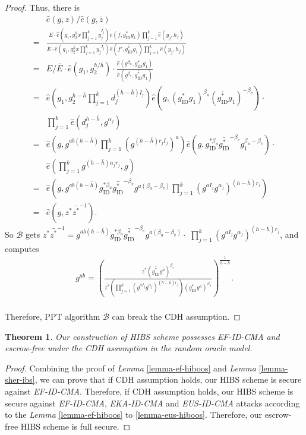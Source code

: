 \documentclass[times]{secauth}
\newtheorem{theorem}{Theorem}[section]
\theoremstyle{definition}
\theoremstyle{remark}
\begin{document}
\begin{proof}
Thus, there is 
\begin{align*}
&\hat{e}(g, z)/\hat{e}(g,\bar{z}) \\
=&\frac{E\cdot \hat{e}(g_1, g_2^hx\prod_{j=1}^k y_j^{I_j})\hat{e}(f, g^*_{\mathrm{ID}}g_1)\prod_{j=1}^k \hat{e}(y_j, h_j)}{\bar{E}\cdot \hat{e}(g_1, g_2^{\bar{h}}x\prod_{j=1}^k {y_j}^{I_j})\hat{e}(f', \bar{g^*_{\mathrm{ID}}}g_1)\prod_{j=1}^k \hat{e}(y_j, h_j)}\\
=& E/\bar{E}\cdot \hat{e}(g_1, g_2^{h/\bar{h}})\cdot \frac{\hat{e}(g^{\beta_u}, g^*_{\mathrm{ID}}g_1)}{\hat{e}(g^{\beta_v}, \bar{g^*_{\mathrm{ID}}}g_1)}\\
=& \hat{e}(g_1, g_2^{h-\bar{h}}\prod_{j=1}^k d_j^{(h-\bar{h})I_j})\hat{e}(g, (g^*_{\mathrm{ID}}g_1)^{\beta_u}(\bar{g^*_{\mathrm{ID}}}g_1)^{-\beta_v})\cdot\\
&\prod_{j=1}^k \hat{e}(d_j^{h-\bar{h}}, g^{\alpha_j})\\
=& \hat{e}(g, g^{ab(h-\bar{h})}\prod_{j=1}^k (g^{(h-\bar{h})r_jI_j})^a) \hat{e}(g, g_{\mathrm{ID}}^{*\beta_u}\bar{g^*_{\mathrm{ID}}}^{-\beta_v} g_1^{\beta_u-\beta_v})\cdot\\
&\hat{e}(\prod_{j=1}^k g^{(h-\bar{h})\alpha_jr_j}, g)\\
=& \hat{e}(g, g^{ab(h-\bar{h})} g_{\mathrm{ID}}^{*\beta_u}\bar{g^*_{\mathrm{ID}}}^{-\beta_v} g^{a(\beta_u-\beta_v)} \prod_{j=1}^k (g^{aI_j} g^{\alpha_j})^{(h-\bar{h})r_j})\\
=& \hat{e}(g, z^*\bar{z^*}^{-1}).
\end{align*}
So $\mathcal{B}$ gets $z^*\bar{z^*}^{-1} = g^{ab(h-\bar{h})} g_{\mathrm{ID}}^{*\beta_u}\bar{g^*_{\mathrm{ID}}}^{-\beta_v} g^{a(\beta_u-\beta_v)}\cdot$ $ \prod_{j=1}^k (g^{aI_j} g^{\alpha_j})^{(h-\bar{h})r_j}$, and computes 
\begin{align*}
g^{ab} = \left(\frac{z^* (\bar{g^*_{\mathrm{ID}}}g^a)^{\beta_v}}{\bar{z^*}\left(\prod_{j=1}^k (g^{aI_j} g^{\alpha_j})^{(h-\bar{h})r_j} \right) (g_{\mathrm{ID}}^* g^a)^{\beta_u}}\right)^{\frac{1}{h-\bar{h}}}.
\end{align*}
\vspace{0.2cm}
\\
Therefore, PPT algorithm $\mathcal{B}$ can break the CDH assumption.
\end{proof}

\begin{theorem}
Our construction of HIBS scheme possesses EF-ID-CMA and escrow-free under the CDH assumption in the random oracle model.
\end{theorem}
\begin{proof}
Combining the proof of \emph{Lemma} \ref{lemma-ef-hiboos} and \emph{Lemma} \ref{lemma-sher-ibs}, we can prove that if CDH assumption holds, our HIBS scheme is secure against \emph{EF-ID-CMA}.
Therefore, if CDH assumption holds, our HIBS scheme is secure against \emph{EF-ID-CMA}, \emph{EKA-ID-CMA} and \emph{EUS-ID-CMA} attacks according to the \emph{Lemma} \ref{lemma-ef-hiboos} to \ref{lemma-eus-hiboos}. 
Therefore, our escrow-free HIBS scheme is full secure.
\end{proof}
\end{document}
